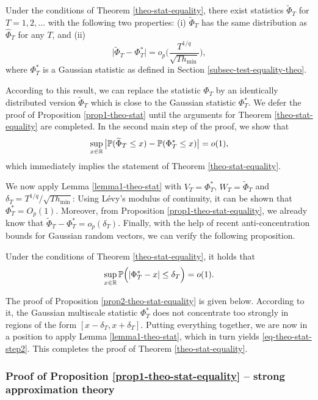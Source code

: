 \documentclass[a4paper,12pt]{article}
\numberwithin{equation}{section}
\begin{document}
 
\begin{propA}\label{prop1-theo-stat-equality}
Under the conditions of Theorem \ref{theo-stat-equality}, there exist statistics $\widetilde{\Phi}_T$ for $T = 1,2,\ldots$ with the following two properties: (i) $\widetilde{\Phi}_T$ has the same distribution as $\widehat{\Phi}_T$ for any $T$, and (ii)
\[ \big| \widetilde{\Phi}_T - \Phi_T^* \big| = o_p \Big( \frac{T^{1/q}}{\sqrt{T h_{\min}}} \Big), \]
where $\Phi_T^*$ is a Gaussian statistic as defined in Section \ref{subsec-test-equality-theo}. 
\end{propA}
According to this result, we can replace the statistic $\widehat{\Phi}_T$ by an identically distributed version $\widetilde{\Phi}_T$ which is close to the Gaussian statistic $\Phi_T^*$. We defer the proof of Proposition \ref{prop1-theo-stat} until the arguments for Theorem \ref{theo-stat-equality} are completed. In the second main step of the proof, we show that 
\begin{equation}\label{eq-theo-stat-equality-step2}
\sup_{x \in \mathbb{R}} \big| \mathbb{P}(\widetilde{\Phi}_T \le x) - \mathbb{P}(\Phi_T^* \le x) \big| = o(1), 
\end{equation}
which immediately implies the statement of Theorem \ref{theo-stat-equality}.

We now apply Lemma \ref{lemma1-theo-stat} with $V_T = \Phi^*_T$, $W_T = \widetilde{\Phi}_T$ and $\delta_T = T^{1/q} / \sqrt{T h_{\min}}$: Using L{\'e}vy's modulus of continuity, it can be shown that $\Phi_T^* = O_p(1)$. Moreover, from Proposition \ref{prop1-theo-stat-equality}, we already know that $\widetilde{\Phi}_T - \Phi_T^* = o_p(\delta_T)$. Finally, with the help of recent anti-concentration bounds for Gaussian random vectors, we can verify the following proposition.
\begin{propA}\label{prop2-theo-stat-equality}
Under the conditions of Theorem \ref{theo-stat-equality}, it holds that 
\[ \sup_{x \in \mathbb{R}} \mathbb{P} \Big( | \Phi_T^* - x | \le \delta_T \Big) = o(1). \]
\end{propA}
The proof of Proposition \ref{prop2-theo-stat-equality} is given below. According to it, the Gaussian multiscale statistic $\Phi_T^*$ does not concentrate too strongly in regions of the form $[x - \delta_T,x + \delta_T]$. Putting everything together, we are now in a position to apply Lemma \ref{lemma1-theo-stat}, which in turn yields \eqref{eq-theo-stat-step2}. This completes the proof of Theorem \ref{theo-stat-equality}. 



\subsubsection*{Proof of Proposition \ref{prop1-theo-stat-equality} -- strong approximation theory}
\end{document}
